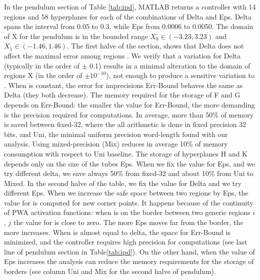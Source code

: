 In the pendulum section of Table \ref{tab:ipd}, MATLAB returns a controller with 14 regions and 58 hyperplanes for each of the combinations of Delta and Eps. Delta spans the interval from 0.05 to 0.3, while Eps from 0.0006 to 0.0050. The domain of X for the pendulum is in the bounded range $X_{0} \in (-3.23, 3.23)$ and $X_{1}\in (-1.46, 1.46)$. The first halve of the section, shows that Delta does not affect the maximal error among regions \maxUij. We verify that a variation for Delta (typically in the order of $\pm$ 0.1) results in a minimal alteration to the domain of regions X (in the order of $\pm 10^{-10}$), not enough to produce a sensitive variation to \maxUij. When \maxUij is constant, the error for imprecisions Err-Bound behaves the same as Delta (they both decrease). The memory required for the storage of F and G depends on Err-Bound: the smaller the value for Err-Bound, the more demanding is the precision required for computations. In average, more than 50\% of memory is saved between fixed-32, where the all arithmetic is done in fixed precision 32 bits, and Uni, the minimal uniform precision word-length found with our analysis. Using mixed-precision (Mix) reduces in average 10\% of memory consumption with respect to Uni baseline. The storage of hyperplanes H and K depends only on the size of the tubes Eps. When we fix the value for Eps, and we try different delta, we save always 50\% from fixed-32 and about 10\% from Uni to Mixed. In the second halve of the table, we fix the value for Delta and we try different Eps. When we increase the safe space between two regions by Eps, the value for \maxUij is computed for new corner points. It happens because of the continuity of PWA activation functions: when \statevarmath is on the border between two generic regions $i$, $j$ the value for \maxUij is close to zero. The more Eps moves \statevarmath far from the border, the more \maxUij increases. When \maxUij is almost equal to delta, the space for Err-Bound is minimized, and the controller requires high precision for computations (see last line of pendulum section in Table\ref{tab:ipd}). On the other hand, when the value of Eps increases the analysis can reduce the memory requirements for the storage of borders (see column Uni and Mix for the second halve of pendulum).

